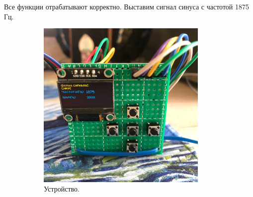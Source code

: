 %	
%	
%	

	Все функции отрабатывают корректно. Выставим сигнал синуса с частотой 1875 Гц.
	
	\begin{figure}[H]\captionsetup[subfigure]{font=normalsize}
     \begin{subfigure}[H]{0.5\textwidth}
         \centering
         \includegraphics[width=0.9\textwidth]{../image/test4_u_f.jpg}
         \caption{Устройство.}
    	\end{subfigure}
     \hfill
     \begin{subfigure}[H]{0.5\textwidth}
         \centering

\end{subfigure}
\end{figure}
